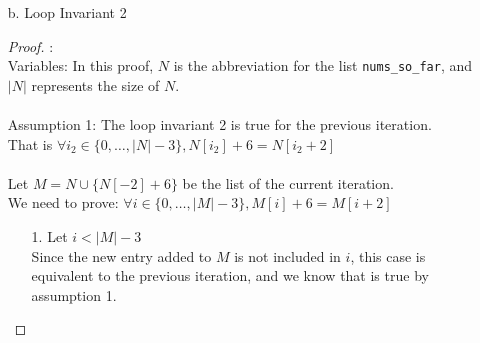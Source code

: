 \documentclass[fontsize=11pt]{article}
\begin{document}
\begin{enumerate}
\begin{enumerate}
\begin{proof}
\begin{enumerate}
    \item[1.] Proving for $gcd(N[-2] + 6, 2) = 1$ \\
        Pick $a = N[-2], k = 3, n = 2$ \\
        Since we know $gcd(N[-2], 2) = 1$, $gcd(a, n) = 1$ is true. \\
        Therefore, by assumption 2, we know that $gcd(a + kn, n) = 1$ is also true. \\
        Substituting the varaibles back, we know $gcd(N[-2] + 6, 2) = 1$.
    \item[2.] Proving for $gcd(N[-2] + 6, 3) = 1$ \\
        Pick $a = N[-2], k = 2, n = 3$ \\
        Since we know $gcd(N[-2], 3) = 1$, $gcd(a, n) = 1$ is true. \\
        Therefore, by assumption 2, we know that $gcd(a + kn, n) = 1$ is also true. \\
        Substituting the varaibles back, we know $gcd(N[-2] + 6, 3) = 1$.
\end{enumerate}
\end{proof}

\item[b.] Loop Invariant 2
\begin{proof} : \\
Variables: In this proof, $N$ is the abbreviation for the list \texttt{nums\_so\_far}, and $|N|$ represents the size of $N$. \\
\\
Assumption 1: The loop invariant 2 is true for the previous iteration. \\
That is $\forall i_2 \in \{ 0, \dots, |N| - 3\}, N[i_2] + 6 = N[i_2 + 2]$ \\
\\
Let $M = N \cup \{ N[-2] + 6 \}$ be the list of the current iteration. \\
We need to prove: $\forall i \in \{0, \dots, |M| - 3\}, M[i] + 6 = M[i + 2] $

\begin{enumerate}
    \item[1.] Let $i < |M| - 3$ \\
        Since the new entry added to $M$ is not included in $i$, this case is equivalent to the previous iteration, and we know that is true by assumption 1.


\end{enumerate}
\end{proof}
\end{enumerate}
\end{enumerate}
\end{document}
